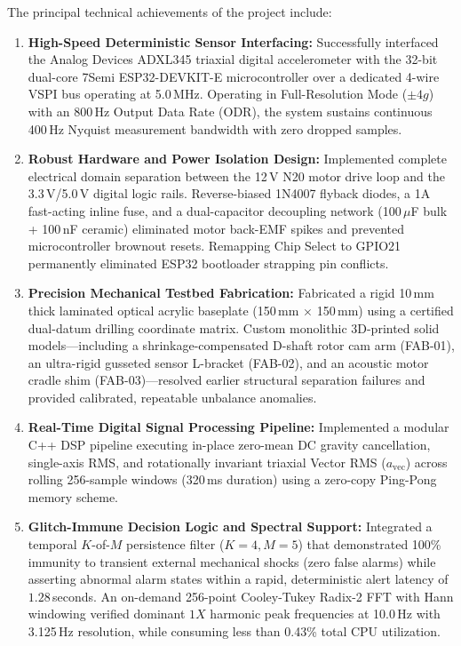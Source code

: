 The principal technical achievements of the project include:
\begin{enumerate}
    \item \textbf{High-Speed Deterministic Sensor Interfacing:} Successfully interfaced the Analog Devices ADXL345 triaxial digital accelerometer with the 32-bit dual-core 7Semi ESP32-DEVKIT-E microcontroller over a dedicated 4-wire VSPI bus operating at 5.0\,MHz. Operating in Full-Resolution Mode ($\pm 4g$) with an 800\,Hz Output Data Rate (ODR), the system sustains continuous 400\,Hz Nyquist measurement bandwidth with zero dropped samples.
    \item \textbf{Robust Hardware and Power Isolation Design:} Implemented complete electrical domain separation between the 12\,V N20 motor drive loop and the 3.3\,V/5.0\,V digital logic rails. Reverse-biased 1N4007 flyback diodes, a 1A fast-acting inline fuse, and a dual-capacitor decoupling network (100\,$\mu$F bulk + 100\,nF ceramic) eliminated motor back-EMF spikes and prevented microcontroller brownout resets. Remapping Chip Select to GPIO21 permanently eliminated ESP32 bootloader strapping pin conflicts.
    \item \textbf{Precision Mechanical Testbed Fabrication:} Fabricated a rigid 10\,mm thick laminated optical acrylic baseplate (150\,mm $\times$ 150\,mm) using a certified dual-datum drilling coordinate matrix. Custom monolithic 3D-printed solid models---including a shrinkage-compensated D-shaft rotor cam arm (FAB-01), an ultra-rigid gusseted sensor L-bracket (FAB-02), and an acoustic motor cradle shim (FAB-03)---resolved earlier structural separation failures and provided calibrated, repeatable unbalance anomalies.
    \item \textbf{Real-Time Digital Signal Processing Pipeline:} Implemented a modular C++ DSP pipeline executing in-place zero-mean DC gravity cancellation, single-axis RMS, and rotationally invariant triaxial Vector RMS ($a_{\mathrm{vec}}$) across rolling 256-sample windows (320\,ms duration) using a zero-copy Ping-Pong memory scheme.
    \item \textbf{Glitch-Immune Decision Logic and Spectral Support:} Integrated a temporal $K$-of-$M$ persistence filter ($K=4, M=5$) that demonstrated 100\% immunity to transient external mechanical shocks (zero false alarms) while asserting abnormal alarm states within a rapid, deterministic alert latency of $1.28$\,seconds. An on-demand 256-point Cooley-Tukey Radix-2 FFT with Hann windowing verified dominant $1X$ harmonic peak frequencies at 10.0\,Hz with 3.125\,Hz resolution, while consuming less than 0.43\% total CPU utilization.
\end{enumerate}

